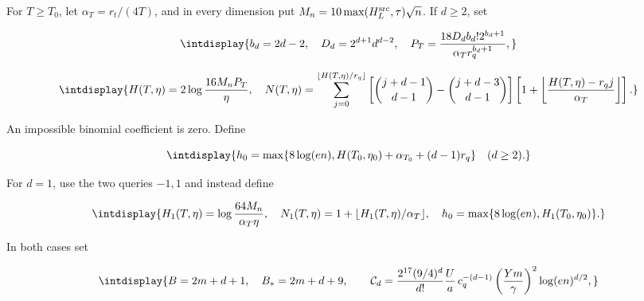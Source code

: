 
For \(T\ge T_0\), let \(\alpha_T=r_t/(4T)\), and in every dimension put \(M_n=10\max(H_L^{\rm src},\allowbreak \tau)\sqrt n\). If \(d\ge2\), set


\begingroup\renewcommand{\theHequation}{intdisplay.179}
\begin{equation*}
\intdisplay{
b_d=2d-2,\quad D_d=2^{d+1}d^{d-2},\quad
P_T=\frac{18D_db_d!2^{b_d+1}}{\alpha_T r_q^{b_d+1}},
}
\end{equation*}
\endgroup

\begingroup\renewcommand{\theHequation}{intdisplay.180}
\begin{equation}
\intdisplay{
H(T,\eta)=2\log\frac{16M_nP_T}{\eta},\quad
N(T,\eta)=\sum_{j=0}^{\lfloor H(T,\eta)/r_q\rfloor}
\left[\binom{j+d-1}{d-1}-\binom{j+d-3}{d-1}\right]
\left[1+\left\lfloor\frac{H(T,\eta)-r_qj}{\alpha_T}\right\rfloor\right].
}
\label{int:eq-0071-harmonic-exact-coefficient-count}
\end{equation}
\endgroup


An impossible binomial coefficient is zero. Define


\begingroup\renewcommand{\theHequation}{intdisplay.181}
\begin{equation*}
\intdisplay{
h_0=\max\{8\log(en),H(T_0,\eta_0)+\alpha_{T_0}+(d-1)r_q\}
\quad(d\ge2).
}
\end{equation*}
\endgroup


For \(d=1\), use the two queries \(-1,\allowbreak 1\) and instead define


\begingroup\renewcommand{\theHequation}{intdisplay.182}
\begin{equation}
\intdisplay{
H_1(T,\eta)=\log\frac{64M_n}{\alpha_T\eta},\quad
N_1(T,\eta)=1+\lfloor H_1(T,\eta)/\alpha_T\rfloor,
\quad h_0=\max\{8\log(en),H_1(T_0,\eta_0)\}.
}
\label{int:eq-0072-harmonic-dimension-one-coefficient-count}
\end{equation}
\endgroup


In both cases set


\begingroup\renewcommand{\theHequation}{intdisplay.183}
\begin{equation*}
\intdisplay{
B=2m+d+1,\quad B_*=2m+d+9,\qquad
\mathcal C_d=\frac{2^{17}(9/4)^d}{d!}\frac Ua\,
 c_q^{-(d-1)}\left(\frac{Ym}{\gamma}\right)^2\log(en)^{d/2},
}
\end{equation*}
\endgroup

